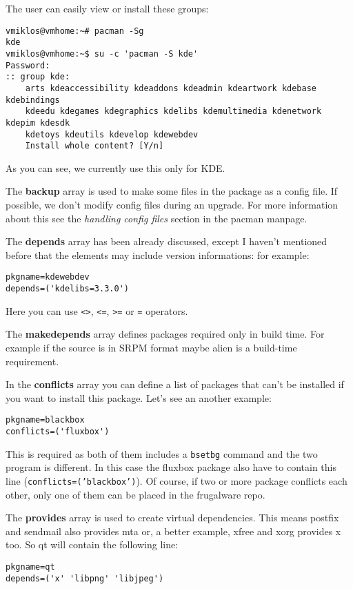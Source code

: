 The user can easily view or install these groups:
\begin{verbatim}
vmiklos@vmhome:~# pacman -Sg
kde
vmiklos@vmhome:~$ su -c 'pacman -S kde'
Password:
:: group kde:
    arts kdeaccessibility kdeaddons kdeadmin kdeartwork kdebase kdebindings
    kdeedu kdegames kdegraphics kdelibs kdemultimedia kdenetwork kdepim kdesdk
    kdetoys kdeutils kdevelop kdewebdev
    Install whole content? [Y/n]
\end{verbatim}

As you can see, we currently use this only for KDE.

The \textbf{backup} array is used to make some files in the package as a config file. If possible, we don't modify config files during an upgrade. For more information about this see the \textit{handling config files} section in the pacman manpage.

The \textbf{depends} array has been already discussed, except I haven't mentioned before that the elements may include version informations: for example:
\begin{verbatim}
pkgname=kdewebdev
depends=('kdelibs=3.3.0')
\end{verbatim}

Here you can use {\tt <>}, {\tt <=}, {\tt >=} or {\tt =} operators.

The \textbf{makedepends} array defines packages required only in build time. For example if the source is in SRPM format maybe alien is a build-time requirement.

In the \textbf{conflicts} array you can define a list of packages that can't be installed if you want to install this package. Let's see an another example:

\begin{verbatim}
pkgname=blackbox
conflicts=('fluxbox')
\end{verbatim}

This is required as both of them includes a {\tt bsetbg} command and the two program is different. In this case the fluxbox package also have to contain this line ({\tt conflicts=('blackbox')}). Of course, if two or more package conflicts each other, only one of them can be placed in the frugalware repo. 

The \textbf{provides} array is used to create virtual dependencies. This means postfix and sendmail also provides mta or, a better example, xfree and xorg provides x too. So qt will contain the following line:
\begin{verbatim}
pkgname=qt
depends=('x' 'libpng' 'libjpeg')
\end{verbatim}

